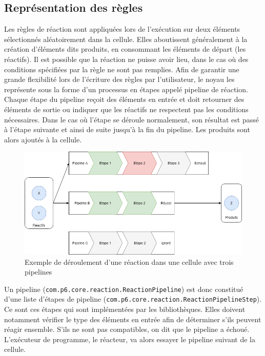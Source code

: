 \documentclass[a4paper, 12pt]{article}
\newcommand{\inline}[1]{\texttt{#1}}
\begin{document}
\subsection{Représentation des règles}
Les règles de réaction sont appliquées lors de l’exécution sur deux éléments sélectionnés aléatoirement dans la cellule. Elles aboutissent généralement à la création d’éléments dits produits, en consommant les éléments de départ (les réactifs). Il est possible que la réaction ne puisse avoir lieu, dans le cas où des conditions spécifiées par la règle ne sont pas remplies. Afin de garantir une grande flexibilité lors de l’écriture des règles par l’utilisateur, le noyau les représente sous la forme d’un processus en étapes appelé pipeline de réaction. Chaque étape du pipeline reçoit des éléments en entrée et doit retourner des éléments de sortie ou indiquer que les réactifs ne respectent pas les conditions nécessaires. Dans le cas où l’étape se déroule normalement, son résultat est passé à l’étape suivante et ainsi de suite jusqu’à la fin du pipeline. Les produits sont alors ajoutés à la cellule.

\begin{figure}[!ht]
  \centering
  \includegraphics[scale=0.5]{./img/Pipeline.png}
  \caption{Exemple de déroulement d'une réaction dans une cellule avec trois pipelines}
\end{figure}

Un pipeline (\inline{com.p6.core.reaction.ReactionPipeline}) est donc constitué d’une liste d’étapes de pipeline (\inline{com.p6.core.reaction.ReactionPipelineStep}). Ce sont ces étapes qui sont implémentées par les bibliothèques. Elles doivent notamment vérifier le type des éléments en entrée afin de déterminer s’ils peuvent réagir ensemble. S’ils ne sont pas compatibles, on dit que le pipeline a échoué. L’exécuteur de programme, le réacteur, va alors essayer le pipeline suivant de la cellule.
\end{document}

